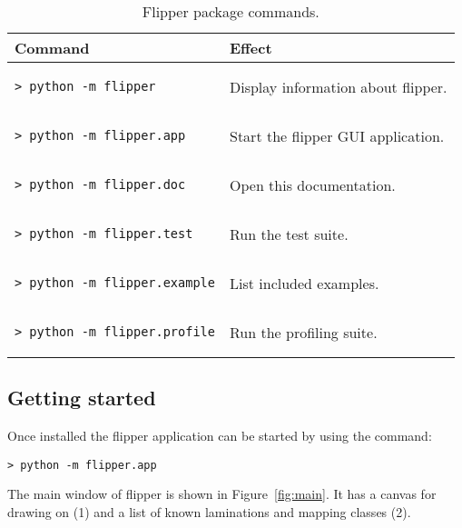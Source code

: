 \documentclass[a4paper]{article}
\begin{document}
\begin{table}[ht]
\label{tbl:package_commands}
\begin{center}
\begin{tabular}{l|l}
Command & Effect \\
\hline
\begin{lstlisting}
> python -m flipper
\end{lstlisting} & Display information about flipper. \\

\begin{lstlisting}
> python -m flipper.app
\end{lstlisting} & Start the flipper GUI application. \\

\begin{lstlisting}
> python -m flipper.doc
\end{lstlisting} & Open this documentation. \\

\begin{lstlisting}
> python -m flipper.test
\end{lstlisting} & Run the test suite. \\

\begin{lstlisting}
> python -m flipper.example
\end{lstlisting} & List included examples. \\

\begin{lstlisting}
> python -m flipper.profile
\end{lstlisting} & Run the profiling suite. \\
\end{tabular}
\end{center}
\caption{Flipper package commands.}
\end{table}

\subsection{Getting started}

Once installed the flipper application can be started by using the command:
\begin{lstlisting}
> python -m flipper.app
\end{lstlisting}

The main window of flipper is shown in Figure~\ref{fig:main}. It has a canvas for drawing on (1) and a list of known laminations and mapping classes (2).
\end{document}

